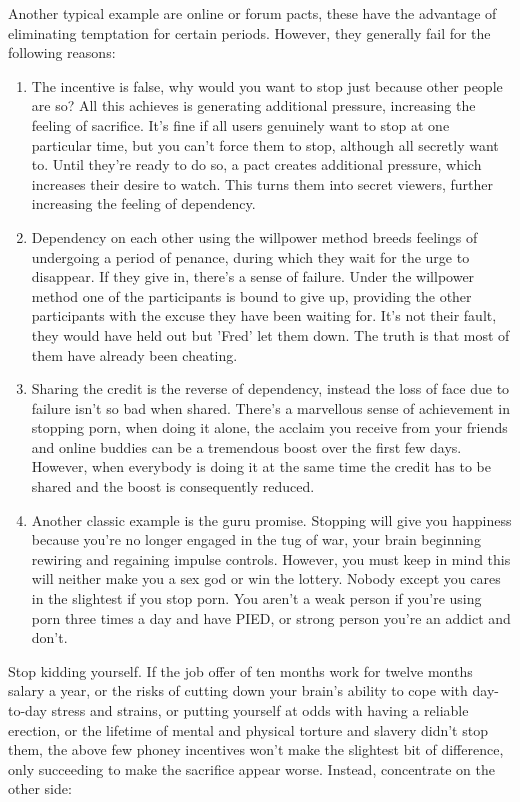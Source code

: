 \documentclass[easypeasy.tex]{subfiles}
\begin{document}
Another typical example are online or forum pacts, these have the advantage of eliminating temptation for certain periods. However, they generally fail for the following reasons:
\begin{enumerate}
  \item The incentive is false, why would you want to stop just because other people are so? All this achieves is generating additional pressure, increasing the feeling of sacrifice. It's fine if all users genuinely want to stop at one particular time, but you can't force them to stop, although all secretly want to. Until they're ready to do so, a pact creates additional pressure, which increases their desire to watch. This turns them into secret viewers, further increasing the feeling of dependency.

  \item Dependency on each other using the willpower method breeds feelings of undergoing a period of penance, during which they wait for the urge to disappear. If they give in, there's a sense of failure. Under the willpower method one of the participants is bound to give up, providing the other participants with the excuse they have been waiting for. It's not their fault, they would have held out but 'Fred' let them down. The truth is that most of them have already been cheating.

  \item Sharing the credit is the reverse of dependency, instead the loss of face due to failure isn't so bad when shared. There's a marvellous sense of achievement in stopping porn, when doing it alone, the acclaim you receive from your friends and online buddies can be a tremendous boost over the first few days. However, when everybody is doing it at the same time the credit has to be shared and the boost is consequently reduced.

  \item Another classic example is the guru promise. Stopping will give you happiness because you're no longer engaged in the tug of war, your brain beginning rewiring and regaining impulse controls. However, you must keep in mind this will neither make you a sex god or win the lottery. Nobody except you cares in the slightest if you stop porn. You aren't a weak person if you're using porn three times a day and have PIED, or strong person you're an addict and don't.
\end{enumerate}

Stop kidding yourself. If the job offer of ten months work for twelve months salary a year, or the risks of cutting down your brain's ability to cope with day-to-day stress and strains, or putting yourself at odds with having a reliable erection, or the lifetime of mental and physical torture and slavery didn't stop them, the above few phoney incentives won't make the slightest bit of difference, only succeeding to make the sacrifice appear worse. Instead, concentrate on the other side:
  
\end{document}
